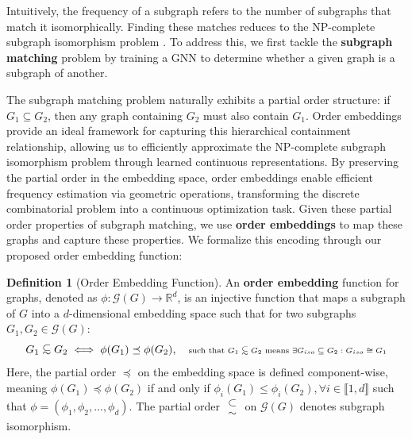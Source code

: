 \documentclass[preprint,12pt]{elsarticle}
\newcommand\subsetsim{\mathrel{\substack{%
  \textstyle\subset\\[-0.2ex]\textstyle\sim}}}
\theoremstyle{plain}
\theoremstyle{definition}
\newtheorem{definition}{Definition}
\theoremstyle{remark}
\begin{document}
Intuitively, the frequency of a subgraph refers to the number of subgraphs that match it isomorphically. Finding these matches reduces to the NP-complete subgraph isomorphism problem \cite{cook2023complexity}. To address this, we first tackle the \textbf{subgraph matching} problem by training a GNN to determine whether a given graph is a subgraph of another.

The subgraph matching problem naturally exhibits a partial order structure: if $G_1 \subseteq G_2$, then any graph containing $G_2$ must also contain $G_1$. Order embeddings provide an ideal framework for capturing this hierarchical containment relationship, allowing us to efficiently approximate the NP-complete subgraph isomorphism problem through learned continuous representations. By preserving the partial order in the embedding space, order embeddings enable efficient frequency estimation via geometric operations, transforming the discrete combinatorial problem into a continuous optimization task. Given these partial order properties of subgraph matching, we use \textbf{order embeddings} to map these graphs and capture these properties. We formalize this encoding through our proposed order embedding function:

\begin{definition}[Order Embedding Function]
An \textbf{order embedding} function for graphs, denoted as $\phi:\mathcal{G}(G) \to \mathbb{R}^d$, is an injective function that maps a subgraph of $G$ into a $d$-dimensional embedding space such that for two subgraphs $G_1, G_2 \in \mathcal{G}(G)$:
\[
G_1 \subsetsim G_2 \iff \phi(G_1) \preceq \phi(G_2), \quad
\text{\scriptsize such that $G_1 \subsetsim G_2$  means $\exists G_{iso} \subseteq G_2 : G_{iso} \cong G_1$}
\]
Here, the partial order $\preceq$ on the embedding space is defined component-wise, meaning $\phi(G_1) \preceq \phi(G_2)$ if and only if $\phi_i(G_1) \leq \phi_i(G_2), \forall i \in \llbracket 1, d \rrbracket$ such that $\phi = (\phi_1, \phi_2, \dots, \phi_d)$. The partial order $\subsetsim$ on $\mathcal{G}(G)$ denotes subgraph isomorphism.
\end{definition}
\end{document}
